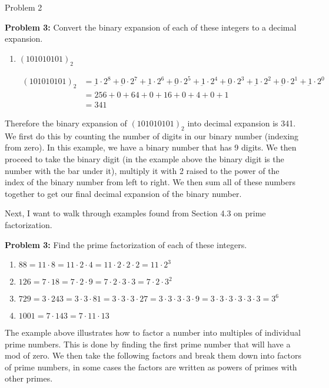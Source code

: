 \begin{problem}{Problem 2}
\begin{highlight}[Solution]
        \noindent \textbf{Problem 3:} Convert the binary expansion of each of these integers to a decimal expansion.

        \begin{enumerate}[label = (\alph*), start = 3]
            \item $(1 0101 0101)_{2}$
            
            \begin{align*}
                (1 0101 0101)_{2} & = \underbar{1} \cdot 2^{8} + \underbar{0} \cdot 2^{7} + \underbar{1} \cdot 2^{6} + \underbar{0} \cdot 2^{5} + \underbar{1} \cdot 2^{4} + \underbar{0} \cdot 2^{3} + \underbar{1} \cdot 2^{2} + \underbar{0} \cdot 2^{1} + \underbar{1} \cdot 2^{0} \\
                & = 256 + 0 + 64 + 0 + 16 + 0 + 4 + 0 + 1 \\
                & = 341
            \end{align*}
        \end{enumerate}
        Therefore the binary expansion of $(1 0101 0101)_{2}$ into decimal expansion is 341. We first do this by counting the number of digits in our binary number (indexing from zero). In this 
        example, we have a binary number that has 9 digits. We then proceed to take the binary digit (in the example above the binary digit is the number with the bar under it), multiply it with 
        2 raised to the power of the index of the binary number from left to right. We then sum all of these numbers together to get our final decimal expansion of the binary number. \vspace*{1em}

        Next, I want to walk through examples found from Section 4.3 on prime factorization. \vspace*{1em}

        \noindent \textbf{Problem 3:} Find the prime factorization of each of these integers.

        \begin{enumerate}[label = (\alph*)]
            \item $88 = 11 \cdot 8 = 11 \cdot 2 \cdot 4 = 11 \cdot 2 \cdot 2 \cdot 2 = 11 \cdot 2^{3}$
            \item $126 = 7 \cdot 18 = 7 \cdot 2 \cdot 9 = 7 \cdot 2 \cdot 3 \cdot 3 = 7 \cdot 2 \cdot 3^{2}$
            \item $729 = 3 \cdot 243 = 3 \cdot 3 \cdot 81 = 3 \cdot 3 \cdot 3 \cdot 27 = 3 \cdot 3 \cdot 3 \cdot 3 \cdot 9 = 3 \cdot 3 \cdot 3 \cdot 3 \cdot 3 \cdot 3 = 3^{6}$
            \item $1001 = 7 \cdot 143 = 7 \cdot 11 \cdot 13$
        \end{enumerate}
        The example above illustrates how to factor a number into multiples of individual prime numbers. This is done by finding the first prime number that will have a mod of zero. We then take the 
        following factors and break them down into factors of prime numbers, in some cases the factors are written as powers of primes with other primes. \vspace*{1em}


\end{highlight}
\end{problem}
